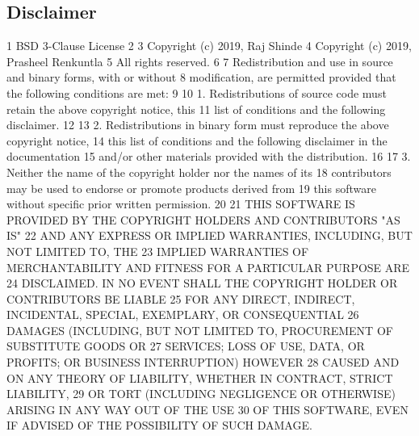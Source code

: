 \subsection*{Disclaimer}


\begin{DoxyCode}
1 BSD 3-Clause License
2 
3 Copyright (c) 2019, Raj Shinde
4 Copyright (c) 2019, Prasheel Renkuntla
5 All rights reserved.
6 
7 Redistribution and use in source and binary forms, with or without
8 modification, are permitted provided that the following conditions are met:
9 
10 1. Redistributions of source code must retain the above copyright notice, this
11    list of conditions and the following disclaimer.
12 
13 2. Redistributions in binary form must reproduce the above copyright notice,
14    this list of conditions and the following disclaimer in the documentation
15    and/or other materials provided with the distribution.
16 
17 3. Neither the name of the copyright holder nor the names of its
18    contributors may be used to endorse or promote products derived from
19    this software without specific prior written permission.
20 
21 THIS SOFTWARE IS PROVIDED BY THE COPYRIGHT HOLDERS AND CONTRIBUTORS "AS IS"
22 AND ANY EXPRESS OR IMPLIED WARRANTIES, INCLUDING, BUT NOT LIMITED TO, THE
23 IMPLIED WARRANTIES OF MERCHANTABILITY AND FITNESS FOR A PARTICULAR PURPOSE ARE
24 DISCLAIMED. IN NO EVENT SHALL THE COPYRIGHT HOLDER OR CONTRIBUTORS BE LIABLE
25 FOR ANY DIRECT, INDIRECT, INCIDENTAL, SPECIAL, EXEMPLARY, OR CONSEQUENTIAL
26 DAMAGES (INCLUDING, BUT NOT LIMITED TO, PROCUREMENT OF SUBSTITUTE GOODS OR
27 SERVICES; LOSS OF USE, DATA, OR PROFITS; OR BUSINESS INTERRUPTION) HOWEVER
28 CAUSED AND ON ANY THEORY OF LIABILITY, WHETHER IN CONTRACT, STRICT LIABILITY,
29 OR TORT (INCLUDING NEGLIGENCE OR OTHERWISE) ARISING IN ANY WAY OUT OF THE USE
30 OF THIS SOFTWARE, EVEN IF ADVISED OF THE POSSIBILITY OF SUCH DAMAGE.
\end{DoxyCode}
 